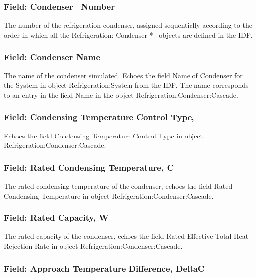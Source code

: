 \subsubsection{Field: Condenser~ Number}\label{field-condenser-number-4}

The number of the refrigeration condenser, assigned sequentially according to the order in which all the Refrigeration: Condenser *~ objects are defined in the IDF.

\subsubsection{Field: Condenser Name}\label{field-condenser-name-4}

The name of the condenser simulated. Echoes the field Name of Condenser for the System in object Refrigeration:System from the IDF. The name corresponds to an entry in the field Name in the object Refrigeration:Condenser:Cascade.

\subsubsection{Field: Condensing Temperature Control Type,}\label{field-condensing-temperature-control-type}

Echoes the field Condensing Temperature Control Type in object Refrigeration:Condenser:Cascade.

\subsubsection{Field: Rated Condensing Temperature, C}\label{field-rated-condensing-temperature-c-2}

The rated condensing temperature of the condenser, echoes the field Rated Condensing Temperature in object Refrigeration:Condenser:Cascade.

\subsubsection{Field: Rated Capacity, W}\label{field-rated-capacity-w-3}

The rated capacity of the condenser, echoes the field Rated Effective Total Heat Rejection Rate in object Refrigeration:Condenser:Cascade.

\subsubsection{Field: Approach Temperature Difference, DeltaC}\label{field-approach-temperature-difference-deltac}

